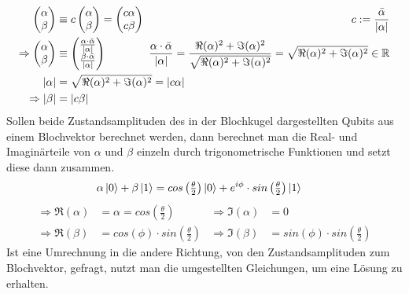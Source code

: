 \documentclass[12pt]{report}
\begin{document}
	\begin{align*}
		 \begin{pmatrix}\alpha\\ \beta\end{pmatrix} &\equiv
		c\begin{pmatrix}\alpha\\ \beta\end{pmatrix} = \begin{pmatrix}c\alpha\\ c\beta\end{pmatrix} & c := \frac{\bar{\alpha}}{\vert \alpha \vert}\\
		\Rightarrow\begin{pmatrix}\alpha\\ \beta\end{pmatrix} &\equiv
		\begin{pmatrix}\frac{\alpha\cdot\bar\alpha}{\vert\alpha\vert}\\ \frac{\beta\cdot\bar\alpha}{\vert\alpha\vert}\end{pmatrix} &
		\hspace{-1.5cm}\frac{\alpha\cdot\bar\alpha}{\vert\alpha\vert} = \frac{\Re(\alpha)^2+\Im(\alpha)^2}{\sqrt{\Re(\alpha)^2+\Im(\alpha)^2}} = \sqrt{\Re(\alpha)^2+\Im(\alpha)^2} \in \mathbb{R}\\
		 \vert\alpha\vert &= \sqrt{\Re(\alpha)^2+\Im(\alpha)^2} = \vert c\alpha\vert \\ \Rightarrow \vert \beta \vert &= \vert c \beta \vert
	\end{align*}
	Sollen beide Zustandsamplituden des in der Blochkugel dargestellten Qubits aus einem Blochvektor berechnet werden, dann berechnet man die Real- und Imaginärteile von $\alpha$ und $\beta$ einzeln durch trigonometrische Funktionen und setzt diese dann zusammen.
	\begin{align}
		 \alpha\ket{0} + \beta\ket{1} &= cos\left(\tfrac{\theta}{2}\right)\ket{0} + e^{i\phi}\cdot sin\left(\tfrac{\theta}{2}\right)\ket{1}
	\end{align}
	\begin{align*}
		 \Rightarrow\Re(\alpha) &= \alpha = cos\left(\frac{\theta}{2}\right) &
		 \Rightarrow\Im(\alpha) &= 0 \\
		 \Rightarrow\Re(\beta) &= cos(\phi)\cdot sin\left(\frac{\theta}{2}\right) & 
		 \Rightarrow\Im(\beta) &= sin(\phi)\cdot sin\left(\frac{\theta}{2}\right)
	\end{align*}
	Ist eine Umrechnung in die andere Richtung, von den Zustandsamplituden zum Blochvektor, gefragt, nutzt man die umgestellten Gleichungen, um eine Lösung zu erhalten.
\end{document}
